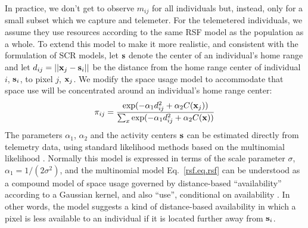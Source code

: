 In practice, we don't get to observe $m_{ij}$ for all individuals but,
instead, only for a small subset which we capture and telemeter.  
For the telemetered individuals, we assume
they use resources according to the same RSF model as the population as
a whole.  To extend this model to make it more realistic, and
consistent with the formulation of SCR models, let ${\bf s}$ denote
the center of an individual's home range and let $d_{ij} = ||{\bf
  x}_{j} - {\bf s}_{i}||$ be the distance from the home range center
of individual $i$, ${\bf s}_{i}$, to pixel $j$, ${\bf x}_{j}$. We
modify the space usage model to accommodate that space use will be
concentrated around an individual's home range center:
\begin{equation}
 \pi_{ij} = \frac{ \exp( -\alpha_{1} d_{ij}^{2} +\alpha_{2} C({\bf x}_{j}) ) }
{ \sum_{x} \exp(-\alpha_{1} d_{ij}^{2} +\alpha_{2} C({\bf x}))}
\label{rsf.eq.rsf}
\end{equation}
The parameters
$\alpha_{1}$, $\alpha_{2}$ and the activity centers ${\bf s}$ can be
estimated directly from telemetry data, using standard
likelihood methods based on the multinomial likelihood
\citep{johnson_etal:2008}.
Normally this model is expressed in terms of the scale parameter $\sigma$,
 $\alpha_1=1/(2\sigma^2)$, 
and the multinomial model 
 Eq.~\ref{rsf.eq.rsf} can be understood as a compound model
of space usage governed by distance-based ``availability'' according
to a Gaussian kernel, and also ``use'', conditional on availability
\citep{johnson_etal:2008, forester_etal:2009}.  
In other words, the model suggests a kind of distance-based
availability in which a pixel is less available to an individual if it
is located further away from ${\bf s}_i$.





